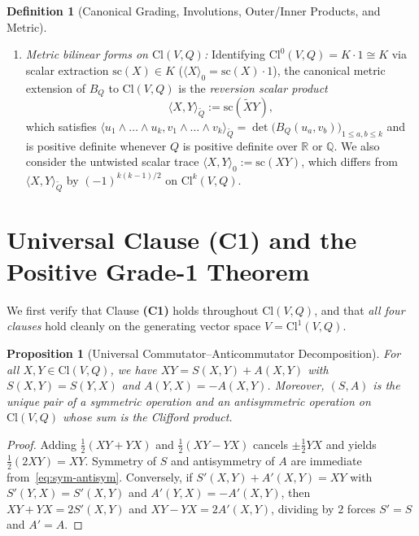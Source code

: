 \documentclass[11pt]{article}
\newcommand{\coloneqq}{\mathrel{:=}}
\theoremstyle{plain}
\newtheorem{proposition}[theorem]{Proposition}
\theoremstyle{definition}
\newtheorem{definition}[theorem]{Definition}
\theoremstyle{remark}
\newcommand{\Cl}{\mathrm{Cl}}
\newcommand{\grade}[2]{\langle #1 \rangle_{#2}}
\begin{document}
\begin{definition}[Canonical Grading, Involutions, Outer/Inner Products, and Metric]
\begin{enumerate}
\begin{align}
    X_r \cdot Y_s &\coloneqq \begin{cases}\grade{X_r Y_s}{|r - s|} & \text{if } r, s \ge 1,\\ 0 & \text{if } r = 0 \text{ or } s = 0,\end{cases} && \text{(Hestenes inner product)}.\label{eq:hestenes}
  \end{align}
  \item[(iv)] \emph{Metric bilinear forms on $\Cl(V, Q)$:} Identifying $\Cl^0(V, Q) = K \cdot 1 \cong K$ via scalar extraction $\mathrm{sc}(X) \in K$ ($\grade{X}{0} = \mathrm{sc}(X)\cdot 1$), the canonical metric extension of $B_Q$ to $\Cl(V, Q)$ is the \emph{reversion scalar product}
  \begin{equation}\label{eq:metric-form}
    \langle X, Y \rangle_{\widetilde{Q}} \coloneqq \mathrm{sc}(\widetilde{X} Y),
  \end{equation}
  which satisfies $\langle u_1 \wedge \dots \wedge u_k, v_1 \wedge \dots \wedge v_k \rangle_{\widetilde{Q}} = \det\bigl(B_Q(u_a, v_b)\bigr)_{1 \le a, b \le k}$ and is positive definite whenever $Q$ is positive definite over $\mathbb{R}$ or $\mathbb{Q}$. We also consider the untwisted scalar trace $\langle X, Y \rangle_0 \coloneqq \mathrm{sc}(X Y)$, which differs from $\langle X, Y \rangle_{\widetilde{Q}}$ by $(-1)^{k(k-1)/2}$ on $\Cl^k(V, Q)$.
\end{enumerate}
\end{definition}

\section{Universal Clause (C1) and the Positive Grade-1 Theorem}

We first verify that Clause \textbf{(C1)} holds throughout $\Cl(V, Q)$, and that \emph{all four clauses} hold cleanly on the generating vector space $V = \Cl^1(V, Q)$.

\begin{proposition}[Universal Commutator--Anticommutator Decomposition]\label{prop:c1}
For all $X, Y \in \Cl(V, Q)$, we have $X Y = S(X, Y) + A(X, Y)$ with $S(X, Y) = S(Y, X)$ and $A(Y, X) = -A(X, Y)$. Moreover, $(S, A)$ is the unique pair of a symmetric operation and an antisymmetric operation on $\Cl(V, Q)$ whose sum is the Clifford product.
\end{proposition}
\begin{proof}
Adding $\frac{1}{2}(X Y + Y X)$ and $\frac{1}{2}(X Y - Y X)$ cancels $\pm \frac{1}{2} Y X$ and yields $\frac{1}{2}(2 X Y) = X Y$. Symmetry of $S$ and antisymmetry of $A$ are immediate from~\eqref{eq:sym-antisym}. Conversely, if $S'(X, Y) + A'(X, Y) = X Y$ with $S'(Y, X) = S'(X, Y)$ and $A'(Y, X) = -A'(X, Y)$, then $X Y + Y X = 2 S'(X, Y)$ and $X Y - Y X = 2 A'(X, Y)$, dividing by $2$ forces $S' = S$ and $A' = A$.
\end{proof}
\end{document}
